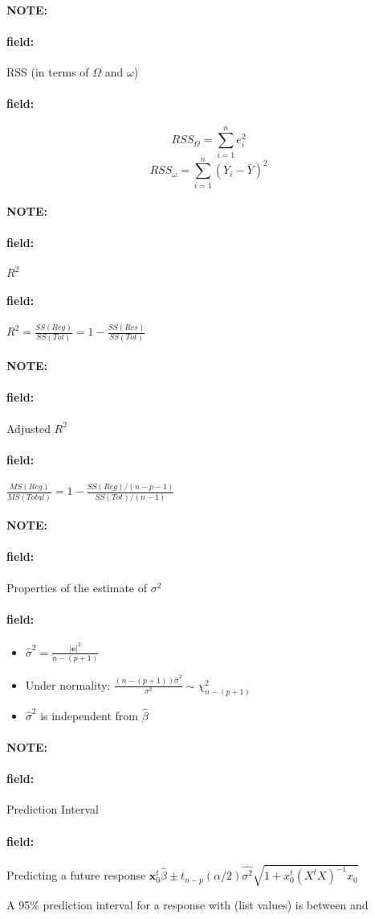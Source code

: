 \documentclass[12pt]{article}
\newenvironment{note}{\paragraph{NOTE:}}{}
\newenvironment{field}{\paragraph{field:}}{}
\begin{document}
\begin{note}
  \begin{field}
    RSS (in terms of $\Omega$ and $\omega$)
  \end{field}
  \begin{field}
    $$RSS_\Omega = \sum_{i=1}^n e_i^2$$
    $$RSS_\omega = \sum_{i=1}^n (Y_i - \bar{Y})^2$$
  \end{field}
\end{note}


\begin{note}
  \begin{field}
    $R^2$
  \end{field}
  \begin{field}
    $R^2 = \frac{SS(Reg)}{SS(Tot)} = 1 - \frac{SS(Res)}{SS(Tot)}$
  \end{field}
\end{note}

\begin{note}
  \begin{field}
    Adjusted $R^2$
  \end{field}
  \begin{field}
    $\frac{MS(Reg)}{MS(Total)} = 1 - \frac{SS(Reg)/(n - p - 1)}{SS(Tot)/(n-1)}$
  \end{field}
\end{note}


\begin{note}
  \begin{field}
    Properties of the estimate of $\sigma^2$
  \end{field}
  \begin{field}
    \begin{itemize}
      \item   $\hat{\sigma}^2 = \frac{|\mathbf{e}|^2}{n - (p+1)}$
      \item Under normality: $\frac{(n - (p+1))\hat{\sigma}^2}{\sigma^2} \sim \chi^2_{n - (p+1)}$
      \item $\hat{\sigma}^2$ is independent from $\hat{\beta}$
    \end{itemize}
  \end{field}
\end{note}


\begin{note}
  \begin{field}
    Prediction Interval
  \end{field}
  \begin{field}
    Predicting a future response
    $\mathbf{x}_0^t \hat{\beta} \pm t_{n-p}(\alpha/2)\hat{\sigma^2} \sqrt{1 + x_0^t(X^tX)^{-1}x_0}$

    A 95\% prediction interval for a response with (list values) is between and
  \end{field}
\end{note}
\end{document}
